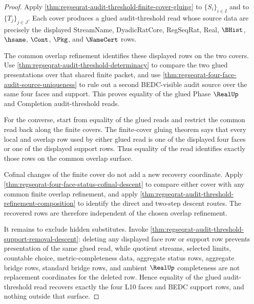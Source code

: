\begin{proof}
Apply \autoref{thm:regseqrat-audit-threshold-finite-cover-gluing} to $\{S_i\}_{i \in I}$ and to $\{T_j\}_{j \in J}$. Each cover produces a glued audit-threshold read whose source data are precisely the displayed StreamName, DyadicRatCore, RegSeqRat, Real, $\BHist$, $\hsame$, $\Cont$, $\Pkg$, and $\NameCert$ rows.

The common overlap refinement identifies these displayed rows on the two covers. Use \autoref{thm:regseqrat-audit-threshold-determinacy} to compare the two glued presentations over that shared finite packet, and use \autoref{thm:regseqrat-four-face-audit-source-uniqueness} to rule out a second BEDC-visible audit source over the same four faces and support. This proves equality of the glued Phase $\RealUp$ and Completion audit-threshold reads.

For the converse, start from equality of the glued reads and restrict the common read back along the finite covers. The finite-cover gluing theorem says that every local and overlap row used by either glued read is one of the displayed four faces or one of the displayed support rows. Thus equality of the read identifies exactly those rows on the common overlap surface.

Cofinal changes of the finite cover do not add a new recovery coordinate. Apply \autoref{thm:regseqrat-four-face-status-cofinal-descent} to compare either cover with any common finite overlap refinement, and apply \autoref{thm:regseqrat-audit-threshold-refinement-composition} to identify the direct and two-step descent routes. The recovered rows are therefore independent of the chosen overlap refinement.

It remains to exclude hidden substitutes. Invoke \autoref{thm:regseqrat-audit-threshold-support-removal-descent}: deleting any displayed face row or support row prevents presentation of the same glued read, while quotient streams, selected limits, countable choice, metric-completeness data, aggregate status rows, aggregate bridge rows, standard bridge rows, and ambient $\RealUp$ completeness are not replacement coordinates for the deleted row. Hence equality of the glued audit-threshold read recovers exactly the four L10 faces and BEDC support rows, and nothing outside that surface.
\end{proof}

